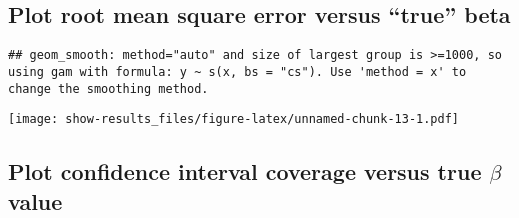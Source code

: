 \documentclass[11pt,]{article}
\newenvironment{Shaded}{\begin{snugshade}}{\end{snugshade}}
\newcommand{\KeywordTok}[1]{\textcolor[rgb]{0.13,0.29,0.53}{\textbf{{#1}}}}
\newcommand{\DataTypeTok}[1]{\textcolor[rgb]{0.13,0.29,0.53}{{#1}}}
\newcommand{\DecValTok}[1]{\textcolor[rgb]{0.00,0.00,0.81}{{#1}}}
\newcommand{\StringTok}[1]{\textcolor[rgb]{0.31,0.60,0.02}{{#1}}}
\newcommand{\CommentTok}[1]{\textcolor[rgb]{0.56,0.35,0.01}{\textit{{#1}}}}
\newcommand{\NormalTok}[1]{{#1}}
\begin{document}
\subsection{\texorpdfstring{Plot root mean square error versus ``true''
beta}{Plot root mean square error versus true beta}}\label{plot-root-mean-square-error-versus-true-beta}

\begin{Shaded}
\end{Shaded}

\begin{verbatim}
## geom_smooth: method="auto" and size of largest group is >=1000, so using gam with formula: y ~ s(x, bs = "cs"). Use 'method = x' to change the smoothing method.
\end{verbatim}

\texttt{[image: show-results\_files/figure-latex/unnamed-chunk-13-1.pdf]}

\subsection{\texorpdfstring{Plot confidence interval coverage versus
true \(\beta\)
value}{Plot confidence interval coverage versus true \textbackslash{}beta value}}\label{plot-confidence-interval-coverage-versus-true-beta-value}
\end{document}
